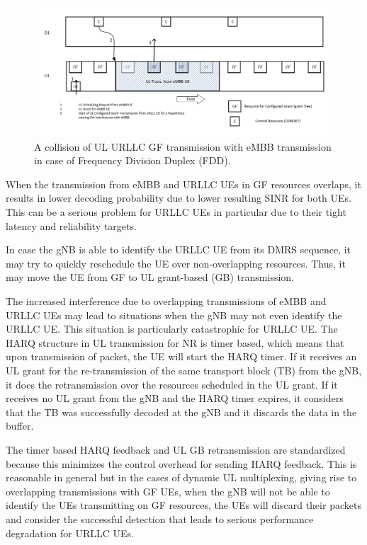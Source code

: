 \documentclass[conference]{IEEEtran}
\begin{document}
\begin{figure}[htbp]
\centerline{\includegraphics[scale=0.22]{fig1.png}}
\caption{A collision of UL URLLC GF transmission with eMBB transmission in case of Frequency Division Duplex (FDD).}
\label{fig1}
\end{figure}

When the transmission from eMBB and URLLC UEs in GF resources overlaps, it results in lower decoding probability due to lower resulting SINR for both UEs. This can be a serious problem for URLLC UEs in particular due to their tight latency and reliability targets.

In case the gNB is able to identify the URLLC UE from its DMRS sequence, it may try to quickly reschedule the UE over non-overlapping resources. Thus, it may move the UE from GF to UL grant-based (GB) transmission.

The increased interference due to overlapping transmissions of eMBB and URLLC UEs may lead to situations when the gNB may not even identify the URLLC UE. This situation is particularly catastrophic for URLLC UE. The HARQ structure in UL transmission for NR is timer based, which means that upon transmission of packet, the UE will start the HARQ timer. If it receives an UL grant for the re-transmission of the same transport block (TB) from the gNB, it does the retransmission over the resources scheduled in the UL grant. If it receives no UL grant from the gNB and the HARQ timer expires, it considers that the TB was successfully decoded at the gNB and it discards the data in the buffer. 

The timer based HARQ feedback and UL GB retransmission are standardized because this minimizes the control overhead for sending HARQ feedback. This is reasonable in general but in the cases of dynamic UL multiplexing, giving rise to overlapping transmissions with GF UEs, when the gNB will not be able to identify the UEs transmitting on GF resources, the UEs will discard their packets and consider the successful detection that leads to serious performance degradation for URLLC UEs.
\end{document}
